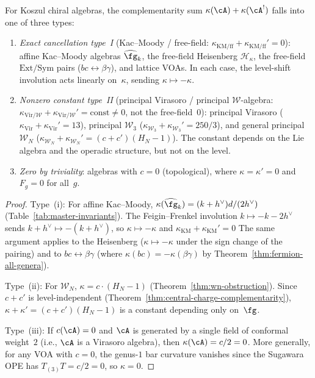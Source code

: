 \begin{proposition}\label{prop:complementarity-classification}

For Koszul chiral algebras, the complementarity sum
$\kappa(\cA) + \kappa(\cA^!)$ falls into one of three types:
\begin{enumerate}[label=\textup{(\roman*)}]
\item \emph{Exact cancellation type~I} (Kac--Moody / free-field: $\kappa_{\mathrm{KM/ff}} + \kappa_{\mathrm{KM/ff}}' = 0$): affine Kac--Moody algebras $\widehat{\fg}_k$, the free-field Heisenberg $\mathcal{H}_\kappa$, the free-field $\mathrm{Ext}/\mathrm{Sym}$ pairs ($bc \leftrightarrow \beta\gamma$), and lattice VOAs. In each case, the level-shift involution acts linearly on~$\kappa$, sending $\kappa \mapsto -\kappa$.
\item \emph{Nonzero constant type~II} (principal Virasoro / principal $\mathcal{W}$-algebra: $\kappa_{\mathrm{Vir}/\mathcal{W}} + \kappa_{\mathrm{Vir}/\mathcal{W}}' = \text{const} \neq 0$, not the free-field~$0$): principal Virasoro ($\kappa_{\mathrm{Vir}} + \kappa_{\mathrm{Vir}}' = 13$), principal $\mathcal{W}_3$ ($\kappa_{\mathcal{W}_3} + \kappa_{\mathcal{W}_3}' = 250/3$), and general principal $\mathcal{W}_N$ ($\kappa_{\mathcal{W}_N} + \kappa_{\mathcal{W}_N}' = (c+c')(H_N - 1)$).
The constant depends on the Lie algebra and the
operadic structure, but not on the level.
\item \emph{Zero by triviality}:
algebras with $c = 0$ (topological), where
$\kappa = \kappa' = 0$ and $F_g = 0$ for all~$g$.
\end{enumerate}
\end{proposition}

\begin{proof}
Type~(i): For affine Kac--Moody, $\kappa(\widehat{\fg}_k)
= (k + h^\vee) d / (2h^\vee)$
(Table~\ref{tab:master-invariants}). The Feigin--Frenkel
involution $k \mapsto -k - 2h^\vee$ sends
$k + h^\vee \mapsto -(k + h^\vee)$, so
$\kappa \mapsto -\kappa$ and $\kappa_{\mathrm{KM}} + \kappa_{\mathrm{KM}}' = 0$ The same argument applies to the Heisenberg ($\kappa \mapsto
-\kappa$ under the sign change of the pairing) and to
$bc \leftrightarrow \beta\gamma$ (where
$\kappa(bc) = -\kappa(\beta\gamma)$ by
Theorem~\ref{thm:fermion-all-genera}).

Type~(ii): For $\mathcal{W}_N$,
$\kappa = c \cdot (H_N - 1)$
(Theorem~\ref{thm:wn-obstruction}).
Since $c + c'$ is level-independent
(Theorem~\ref{thm:central-charge-complementarity}),
$\kappa + \kappa' = (c + c')(H_N - 1)$ is a constant
depending only on~$\fg$.

Type~(iii): If $c(\cA) = 0$ and $\cA$ is generated by a
single field of conformal weight~$2$ (i.e., $\cA$ is a
Virasoro algebra), then $\kappa(\cA) = c/2 = 0$.
More generally, for any VOA with $c = 0$, the genus-$1$
bar curvature vanishes since the Sugawara OPE has $T_{(3)}T = c/2 = 0$,
so $\kappa = 0$.
\end{proof}

